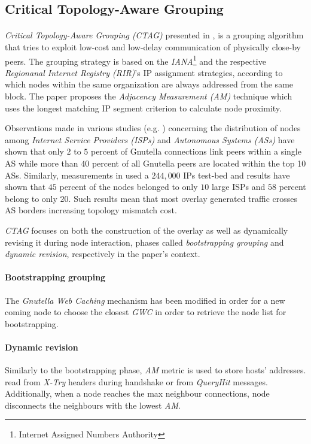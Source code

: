 \documentclass[a4paper,10pt]{article}
\begin{document}
\subsection{Critical Topology-Aware Grouping}

\paragraph{}
\emph{Critical Topology-Aware Grouping (CTAG)} presented in \cite{zhao_ctag_2006}, is a grouping algorithm that tries to exploit low-cost and low-delay communication of physically close-by peers. The grouping strategy is based on the \emph{IANA}\footnote{Internet Assigned Numbers Authority} and the respective \emph{Regionanal Internet Registry (RIR)}'s IP assignment strategies, according to which nodes within the same organization are always addressed from the same block. The paper proposes the \emph{Adjacency Measurement (AM)} technique which uses the longest matching IP segment criterion to calculate node proximity.

Observations made in various studies (e.g. \cite{matei_mapgnutella_2002}) concerning the distribution of nodes among \emph{Internet Service Providers (ISPs)} and \emph{Autonomous Systems (ASs)} have shown that only $2$ to $5$ percent of Gnutella connections link peers within a single AS while more than $40$ percent of all Gnutella peers are located within the top 10 ASs. Similarly, measurements in \cite{zeinalipour-yazti_gnudc_2002} used a $244,000$ IPs test-bed and results have shown that $45$ percent of the nodes belonged to only $10$ large ISPs and $58$ percent belong to only $20$. Such results mean that most overlay generated traffic crosses AS borders increasing topology mismatch cost.

\emph{CTAG} focuses on both the construction of the overlay as well as dynamically revising it during node interaction, phases called \emph{bootstrapping grouping} and \emph{dynamic revision}, respectively in the paper's context.

\paragraph{Bootstrapping grouping}
The \emph{Gnutella Web Caching} mechanism has been modified in order for a new coming node to choose the closest \emph{GWC} in order to retrieve the node list for bootstrapping.

\paragraph{Dynamic revision}
Similarly to the bootstrapping phase, \emph{AM} metric is used to store hosts' addresses. read from \emph{X-Try} headers during handshake or from \emph{QueryHit} messages. Additionally, when a node reaches the max neighbour connections, node disconnects the neighbours with the lowest \emph{AM}.
\end{document}
